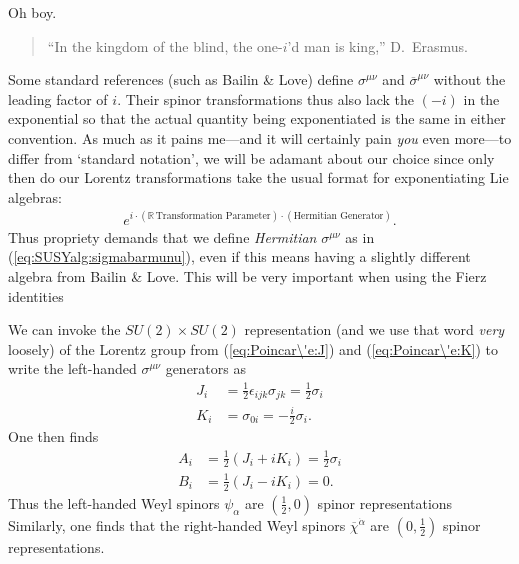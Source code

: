 \documentclass[12pt, oneside]{report}    %
\begin{document}
\begin{example}[Factors of $i$] Oh boy.
\begin{quote}
``In the kingdom of the blind, the one-$i$'d man is king,'' D.\ Erasmus.
\end{quote}
% 
Some standard references (such as Bailin \& Love\footnotemark) define $\sigma^{\mu\nu}$ and $\overline\sigma^{\mu\nu}$ without the leading factor of $i$. Their spinor transformations thus also lack the $(-i)$ in the exponential so that the actual quantity being exponentiated is the same in either convention. As much as it pains me---and it will certainly pain \textit{you} even more---to differ from `standard notation', we will be adamant about our choice since only then do our Lorentz transformations take the usual format for exponentiating Lie algebras:
    \begin{align}
        e^{i\cdot(\mathbb R\,\text{Transformation Parameter})\cdot(\text{Hermitian Generator})}.
    \end{align} 
Thus propriety demands that we define \textit{Hermitian} $\sigma^{\mu\nu}$ as in  (\ref{eq:SUSYalg:sigmabarmunu}), even if this means having a slightly different algebra from Bailin \& Love. This will be very important when using the Fierz identities
\end{example}

We can invoke the $SU(2)\times SU(2)$ representation (and we use that word \emph{very} loosely) of the Lorentz group from (\ref{eq:Poincar\'e:J}) and (\ref{eq:Poincar\'e:K}) to write the left-handed $\sigma^{\mu\nu}$ generators as
\begin{align}
    J_i &= \frac 12 \epsilon_{ijk}\sigma_{jk} = \frac 12 \sigma_i\label{eq:SUSYalg:Jpauli}\\
    K_i &= \sigma_{0i} = -\frac i2 \sigma_i.\label{eq:SUSYalg:Kpauli}
\end{align}
One then finds
\begin{align}
    A_i &= \frac 12 (J_i+iK_i) = \frac 12 \sigma_i\\
    B_i &= \frac 12 (J_i - iK_i) = 0.
\end{align}
Thus the left-handed Weyl spinors $\psi_\alpha$ are $(\frac 12, 0)$ spinor representations Similarly, one finds that the right-handed Weyl spinors $\overline \chi^{\dot\alpha}$ are $(0,\frac 12)$ spinor representations.
\end{document}
